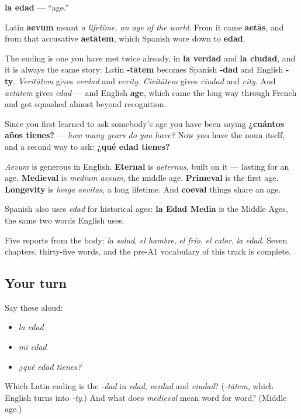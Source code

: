 \begin{cousinweb}
\textbf{la edad} — \textquotedblleft{}age.\textquotedblright{}

Latin \textbf{aevum} meant \emph{a lifetime, an age of the world}. From it came \textbf{aetās}, and from that accusative \textbf{aetātem}, which Spanish wore down to \textbf{edad}.

The ending is one you have met twice already, in \textbf{la verdad} and \textbf{la ciudad}, and it is always the same story: Latin \textbf{-tātem} becomes Spanish \textbf{-dad} and English \textbf{-ty}. \emph{Veritātem} gives \emph{verdad} and \emph{verity}. \emph{Civitātem} gives \emph{ciudad} and \emph{city}. And \emph{aetātem} gives \emph{edad} — and English \textbf{age}, which came the long way through French and got squashed almost beyond recognition.

Since you first learned to ask somebody's age you have been saying \textbf{¿cuántos años tienes?} — \emph{how many years do you have?} Now you have the noun itself, and a second way to ask: \textbf{¿qué edad tienes?}

\emph{Aevum} is generous in English. \textbf{Eternal} is \emph{aeternus}, built on it — lasting for an age. \textbf{Medieval} is \emph{medium aevum}, the middle age. \textbf{Primeval} is the first age. \textbf{Longevity} is \emph{longa aevitas}, a long lifetime. And \textbf{coeval} things share an age.

Spanish also uses \emph{edad} for historical ages: \textbf{la Edad Media} is the Middle Ages, the same two words English uses.
\end{cousinweb}

\begin{grammarlens}[title={What you've built}]
Five reports from the body: \emph{la salud}, \emph{el hambre}, \emph{el frío}, \emph{el calor}, \emph{la edad}. Seven chapters, thirty-five words, and the pre-A1 vocabulary of this track is complete.
\end{grammarlens}

\subsection*{Your turn}
Say these aloud:

\begin{itemize}
\raggedright
  \item \emph{la edad}
  \item \emph{mi edad}
  \item \emph{¿qué edad tienes?}
\end{itemize}

\begin{tcolorbox}[breakable,colback=teal!4,colframe=teal!35!black,title={Before you move on}]
Which Latin ending is the \emph{-dad} in \emph{edad}, \emph{verdad} and \emph{ciudad}? (\emph{-tātem}, which English turns into \emph{-ty}.) And what does \emph{medieval} mean word for word? (Middle age.)
\end{tcolorbox}
